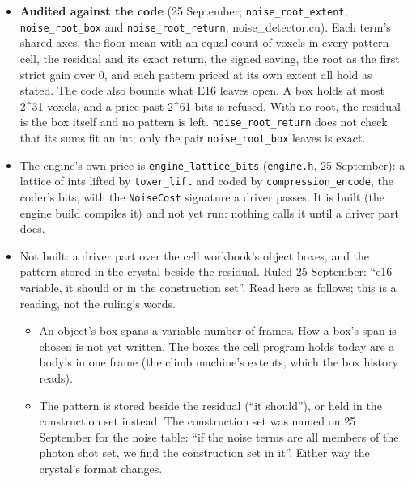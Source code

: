 \begin{itemize}
\begin{itemize}
\item The stack term's pattern is the largest, 16 × 32 × 32 values, against 32 × 32 for the fixed pattern and 16 × 12 for the planes. That it pays last for that reason is a reading; the patterns' own bits were not printed.
\item The noise vector table puts the coherent terms on the kcr set at 1.0\% to 3.0\% of the static background's frame-difference bits (a Gaussian estimate). A real box may hold no root (a reading, still unmeasured).
\end{itemize}
\item \textbf{Audited against the code} (25 September; \texttt{noise\_\allowbreak{}root\_\allowbreak{}extent}, \texttt{noise\_\allowbreak{}root\_\allowbreak{}box} and \texttt{noise\_\allowbreak{}root\_\allowbreak{}return}, noise\_\allowbreak{}detector.cu). Each term's shared axes, the floor mean with an equal count of voxels in every pattern cell, the residual and its exact return, the signed saving, the root as the first strict gain over 0, and each pattern priced at its own extent all hold as stated. The code also bounds what E16 leaves open. A box holds at most 2\textasciicircum{}31 voxels, and a price past 2\textasciicircum{}61 bits is refused. With no root, the residual is the box itself and no pattern is left. \texttt{noise\_\allowbreak{}root\_\allowbreak{}return} does not check that its sums fit an int; only the pair \texttt{noise\_\allowbreak{}root\_\allowbreak{}box} leaves is exact.
\item The engine's own price is \texttt{engine\_\allowbreak{}lattice\_\allowbreak{}bits} (\texttt{engine.\allowbreak{}h}, 25 September): a lattice of ints lifted by \texttt{tower\_\allowbreak{}lift} and coded by \texttt{compression\_\allowbreak{}encode}, the coder's bits, with the \texttt{Noise\allowbreak{}Cost} signature a driver passes. It is built (the engine build compiles it) and not yet run: nothing calls it until a driver part does.
\item Not built: a driver part over the cell workbook's object boxes, and the pattern stored in the crystal beside the residual. Ruled 25 September: “e16 variable, it should or in the construction set”. Read here as follows; this is a reading, not the ruling's words.

\begin{itemize}
\item An object's box spans a variable number of frames. How a box's span is chosen is not yet written. The boxes the cell program holds today are a body's in one frame (the climb machine's extents, which the box history reads).
\item The pattern is stored beside the residual (“it should”), or held in the construction set instead. The construction set was named on 25 September for the noise table: “if the noise terms are all members of the photon shot set, we find the construction set in it”. Either way the crystal's format changes.
\end{itemize}
\end{itemize}

